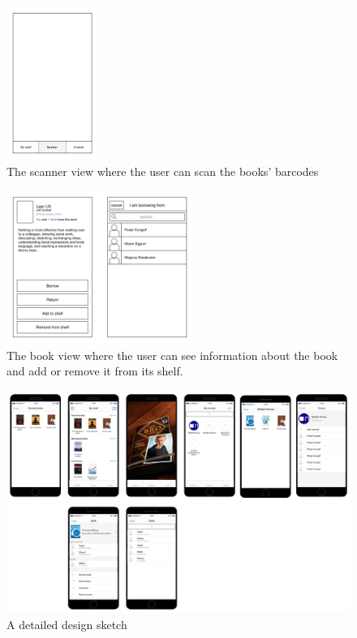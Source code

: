 \begin{figure}
\centering
\includegraphics[height=5cm]{figs/v04/Scanner.png}
\caption{The scanner view where the user can scan the books' barcodes}
\label{fig:ios-scanner}
\end{figure}

\begin{figure}
\centering
\includegraphics[height=5cm]{figs/v04/Book.png}
\caption{The book view where the user can see information about the book and add or remove it from its shelf.}
\label{fig:ios-book}
\end{figure}

\begin{figure}
\centering
\includegraphics[width=14cm]{figs/v04/detailed-mockup.png}
\caption{A detailed design sketch}
\label{fig:design-sketch-4}
\end{figure}


